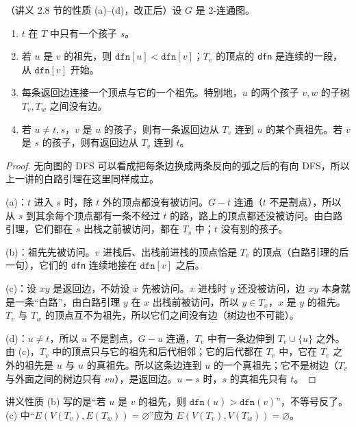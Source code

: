 \begin{proposition}\label{prop:st-numbering:dfs-tree}
（讲义 2.8 节的性质 (a)--(d)，改正后）设 $G$ 是 $2$-连通图。
\begin{enumerate}
\item[(a)] $t$ 在 $T$ 中只有一个孩子 $s$。
\item[(b)] 若 $u$ 是 $v$ 的祖先，则 $\texttt{dfn}[u]<\texttt{dfn}[v]$；$T_v$ 的顶点的 \texttt{dfn} 是连续的一段，从 $\texttt{dfn}[v]$ 开始。
\item[(c)] 每条返回边连接一个顶点与它的一个祖先。特别地，$u$ 的两个孩子 $v,w$ 的子树 $T_v,T_w$ 之间没有边。
\item[(d)] 若 $u\neq t,s$，$v$ 是 $u$ 的孩子，则有一条返回边从 $T_v$ 连到 $u$ 的某个真祖先。若 $v$ 是 $s$ 的孩子，则有返回边从 $T_v$ 连到 $t$。
\end{enumerate}
\end{proposition}
\begin{proof}
无向图的 DFS 可以看成把每条边换成两条反向的弧之后的有向 DFS，所以上一讲的白路引理在这里同样成立。

(a)：$t$ 进入 $s$ 时，除 $t$ 外的顶点都没有被访问。$G-t$ 连通（$t$ 不是割点），所以从 $s$ 到其余每个顶点都有一条不经过 $t$ 的路，路上的顶点都还没被访问。由白路引理，它们都在 $s$ 出栈之前被访问，都在 $T_s$ 中；$t$ 没有别的孩子。

(b)：祖先先被访问。$v$ 进栈后、出栈前进栈的顶点恰是 $T_v$ 的顶点（白路引理的后一句），它们的 \texttt{dfn} 连续地接在 $\texttt{dfn}[v]$ 之后。

(c)：设 $xy$ 是返回边，不妨设 $x$ 先被访问。$x$ 进栈时 $y$ 还没被访问，边 $xy$ 本身就是一条“白路”，由白路引理 $y$ 在 $x$ 出栈前被访问，所以 $y\in T_x$，$x$ 是 $y$ 的祖先。$T_v$ 与 $T_w$ 的顶点互不为祖先，所以它们之间没有边（树边也不可能）。

(d)：$u\neq t$，所以 $u$ 不是割点，$G-u$ 连通，$T_v$ 中有一条边伸到 $T_v\cup\{u\}$ 之外。由 (c)，$T_v$ 中的顶点只与它的祖先和后代相邻；它的后代都在 $T_v$ 中，它在 $T_v$ 之外的祖先是 $u$ 与 $u$ 的真祖先。所以这条边连到 $u$ 的一个真祖先；它不是树边（$T_v$ 与外面之间的树边只有 $vu$），是返回边。$u=s$ 时，$s$ 的真祖先只有 $t$。
\end{proof}

\begin{remark}[讲义的笔误]
讲义性质 (b) 写的是“若 $u$ 是 $v$ 的祖先，则 $\texttt{dfn}(u)>\texttt{dfn}(v)$”，不等号反了。(c) 中“$E(V(T_v),E(T_w))=\varnothing$”应为 $E(V(T_v),V(T_w))=\varnothing$。
\end{remark}


